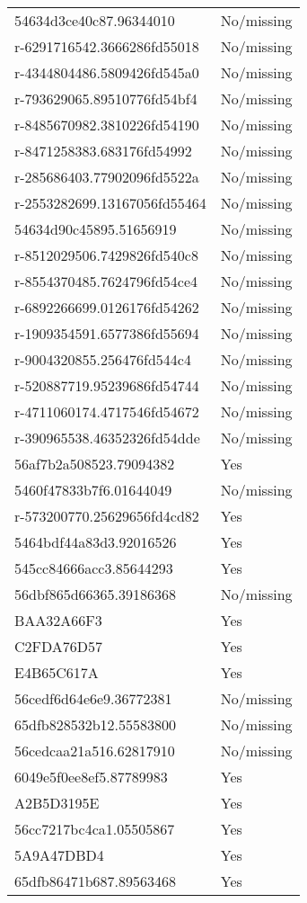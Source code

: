 \begin{tabular}{ll}
54634d3ce40c87.96344010 & No/missing \\
r-6291716542.3666286fd55018 & No/missing \\
r-4344804486.5809426fd545a0 & No/missing \\
r-793629065.89510776fd54bf4 & No/missing \\
r-8485670982.3810226fd54190 & No/missing \\
r-8471258383.683176fd54992 & No/missing \\
r-285686403.77902096fd5522a & No/missing \\
r-2553282699.13167056fd55464 & No/missing \\
54634d90c45895.51656919 & No/missing \\
r-8512029506.7429826fd540c8 & No/missing \\
r-8554370485.7624796fd54ce4 & No/missing \\
r-6892266699.0126176fd54262 & No/missing \\
r-1909354591.6577386fd55694 & No/missing \\
r-9004320855.256476fd544c4 & No/missing \\
r-520887719.95239686fd54744 & No/missing \\
r-4711060174.4717546fd54672 & No/missing \\
r-390965538.46352326fd54dde & No/missing \\
56af7b2a508523.79094382 & Yes \\
5460f47833b7f6.01644049 & No/missing \\
r-573200770.25629656fd4cd82 & Yes \\
5464bdf44a83d3.92016526 & Yes \\
545cc84666acc3.85644293 & Yes \\
56dbf865d66365.39186368 & No/missing \\
BAA32A66F3 & Yes \\
C2FDA76D57 & Yes \\
E4B65C617A & Yes \\
56cedf6d64e6e9.36772381 & No/missing \\
65dfb828532b12.55583800 & No/missing \\
56cedcaa21a516.62817910 & No/missing \\
6049e5f0ee8ef5.87789983 & Yes \\
A2B5D3195E & Yes \\
56cc7217bc4ca1.05505867 & Yes \\
5A9A47DBD4 & Yes \\
65dfb86471b687.89563468 & Yes \\

\end{tabular}

